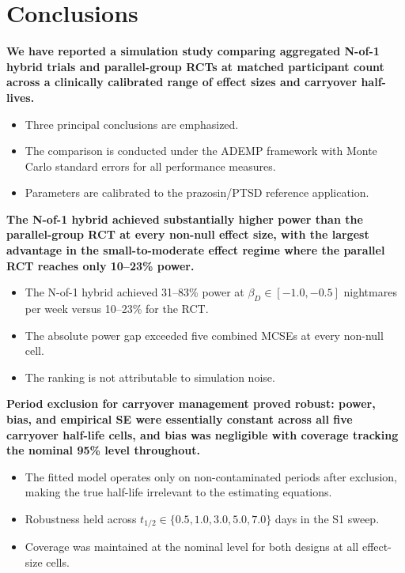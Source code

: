 \documentclass[
  11pt,
]{article}
\begin{document}
\section{Conclusions}\label{conclusions}

\textbf{We have reported a simulation study comparing aggregated N-of-1 hybrid trials and parallel-group RCTs at matched participant count across a clinically calibrated range of effect sizes and carryover half-lives.}

\begin{itemize}\setlength{\itemsep}{2pt}\setlength{\parskip}{0pt}
\item Three principal conclusions are emphasized.
\item The comparison is conducted under the ADEMP framework with Monte Carlo standard errors for all performance measures.
\item Parameters are calibrated to the prazosin/PTSD reference application.
\end{itemize}

\textbf{The N-of-1 hybrid achieved substantially higher power than the parallel-group RCT at every non-null effect size, with the largest advantage in the small-to-moderate effect regime where the parallel RCT reaches only 10--23\% power.}

\begin{itemize}\setlength{\itemsep}{2pt}\setlength{\parskip}{0pt}
\item The N-of-1 hybrid achieved 31--83\% power at $\beta_D \in [-1.0, -0.5]$ nightmares per week versus 10--23\% for the RCT.
\item The absolute power gap exceeded five combined MCSEs at every non-null cell.
\item The ranking is not attributable to simulation noise.
\end{itemize}

\textbf{Period exclusion for carryover management proved robust: power, bias, and empirical SE were essentially constant across all five carryover half-life cells, and bias was negligible with coverage tracking the nominal 95\% level throughout.}

\begin{itemize}\setlength{\itemsep}{2pt}\setlength{\parskip}{0pt}
\item The fitted model operates only on non-contaminated periods after exclusion, making the true half-life irrelevant to the estimating equations.
\item Robustness held across $t_{1/2} \in \{0.5, 1.0, 3.0, 5.0, 7.0\}$ days in the S1 sweep.
\item Coverage was maintained at the nominal level for both designs at all effect-size cells.
\end{itemize}
\end{document}
